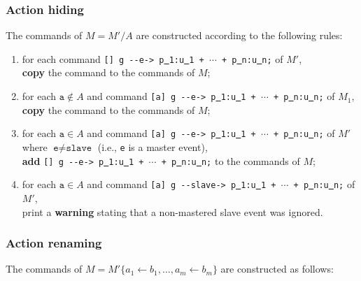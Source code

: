 \documentclass{article}
\newcommand{\arci}[1]{{-}{-}{#1}->}
\renewcommand{\_}{\underline{~}}
\newcommand{\code}[1]{\texttt{#1}}
\begin{document}
\subsubsection*{Action hiding}

The commands of $M = M'/A$ are constructed according to the following rules:

\begin{enumerate}
	
	\item for each command \code{[] g \arci{e} p\_1:u\_1 + $\cdots$ + p\_n:u\_n;} of $M'$, \\ 
	\textbf{copy} the command to the commands of $M$;
	
    \item for each $\code{a} \not\in A$ and command \code{[a] g \arci{e}  p\_1:u\_1 + $\cdots$ + p\_n:u\_n;} of $M_1$, \\ 
	\textbf{copy} the command to the commands of $M$;
	
	\item for each $\code{a} \in A$ and command \code{[a] g \arci{e}  p\_1:u\_1 + $\cdots$ + p\_n:u\_n;} of $M'$ where $\code{e} \neq \code{slave}$ (i.e., \code{e} is a master event), \\
\textbf{add} \code{[] g \arci{e}  p\_1:u\_1 + $\cdots$ + p\_n:u\_n;} to the commands of $M$;

    \item\label{it:non-mastered-slave} for each $\code{a} \in A$ and command \code{[a] g \arci{slave}  p\_1:u\_1 + $\cdots$ + p\_n:u\_n;} of $M'$, \\ print a \textbf{warning} stating that a non-mastered slave event was ignored.
\end{enumerate}

\subsubsection*{Action renaming}

The commands of $M= M'\{a_1 \leftarrow b_1, \ldots, a_m \leftarrow b_m \}$ are constructed as follows:
\end{document}
